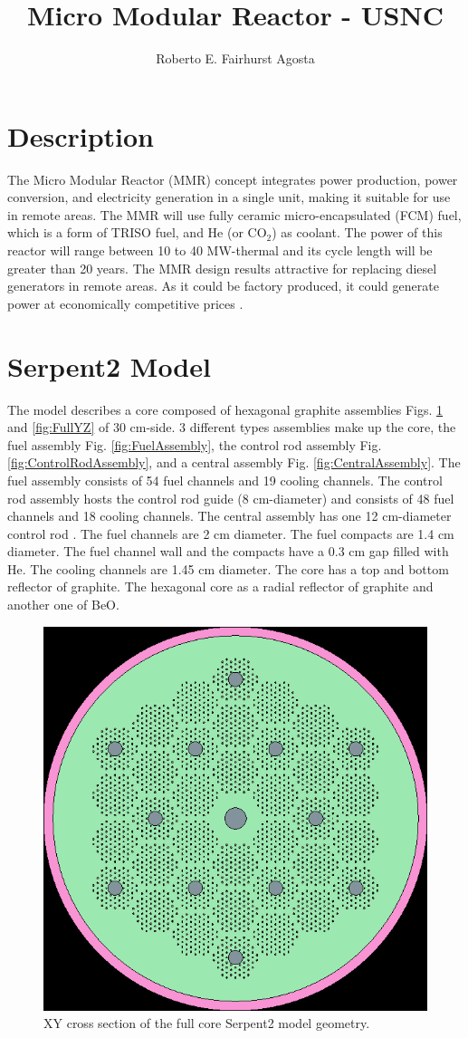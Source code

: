 \documentclass[11pt,letterpaper]{article}
\title{Micro Modular Reactor - USNC}
\author{Roberto E. Fairhurst Agosta}
\begin{document}

\section{Description}	

The Micro Modular Reactor (MMR) concept integrates power production, power conversion, and electricity generation in a single unit, making it suitable for use in remote areas. 
The MMR will use fully ceramic micro-encapsulated (FCM) fuel, which is a form of TRISO fuel, and He (or CO$_2$) as coolant.
The power of this reactor will range between 10 to 40 MW-thermal and its cycle length will be greater than 20 years.
The MMR design results attractive for replacing diesel generators in remote areas. As it could be factory produced, it could generate power at economically competitive prices \cite{hawari_development_2018}.

\section{Serpent2 Model}

The model describes a core composed of hexagonal graphite assemblies Figs. \ref{fig:FullXY} and \ref{fig:FullYZ} of 30 cm-side. 3 different types assemblies make up the core, the fuel assembly Fig. \ref{fig:FuelAssembly}, the control rod assembly Fig. \ref{fig:ControlRodAssembly}, and a central assembly Fig. \ref{fig:CentralAssembly}. The fuel assembly consists of 54 fuel channels and 19 cooling channels. The control rod assembly hosts the control rod guide (8 cm-diameter) and consists of 48 fuel channels and 18 cooling channels. The central assembly has one 12 cm-diameter control rod \cite{hawari_development_2018}. The fuel channels are 2 cm diameter. The fuel compacts are 1.4 cm diameter. The fuel channel wall and the compacts have a 0.3 cm gap filled with He. The cooling channels are 1.45 cm diameter. The core has a top and bottom reflector of graphite. The hexagonal core as a radial reflector of graphite and another one of BeO.

\begin{figure}[H]
	\centering
	\includegraphics[width=0.45\linewidth]{figures/MMR_full_stack_geom1.png}
	\hfill
	\caption{XY cross section of the full core Serpent2 model geometry.}
	\label{fig:FullXY}
\end{figure}
\end{document}
